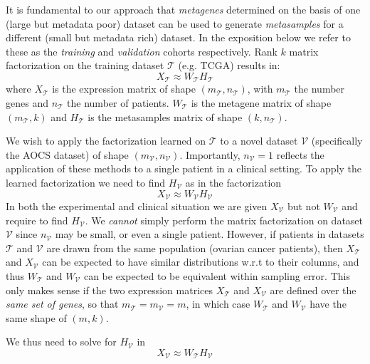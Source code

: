 \documentclass[tikz, 11pt,a4paper,oneside,fleqn, draft]{article}
\begin{document}
\newcommand{\trainset}{\mathcal{T}}
\newcommand{\validset}{\mathcal{V}}

It is fundamental to our approach that \emph{metagenes} determined on the basis of one (large but metadata poor) dataset can be used to generate \emph{metasamples} for a different (small but metadata rich) dataset.   In the exposition below we refer to these as the \emph{training} and \emph{validation} cohorts respectively.
Rank $k$ matrix factorization on the training dataset $\trainset$ (e.g. TCGA) results in:
\begin{equation}
 X_\trainset \approx W_\trainset H_\trainset
\end{equation}
where $X_\trainset$ is the expression matrix of shape $(m_\trainset, n_\trainset)$, with $m_\trainset$ the number genes and $n_\trainset$ the number of patients. $W_\trainset$ is the metagene matrix of shape $(m_\trainset, k)$ and $H_\trainset$ is the metasamples matrix of shape $(k, n_\trainset)$.

We wish to apply the factorization learned on $\trainset$ to a novel dataset $\validset$ (specifically the AOCS dataset) of shape $(m_\validset, n_\validset)$. 
Importantly, $n_\validset = 1$ reflects the application of these methods to a single patient in a clinical setting.  To apply the learned factorization we need to find $H_\validset$ as in the factorization
\begin{equation}
	X_\validset \approx W_\validset H_\validset
\end{equation}
In both the experimental and clinical situation we are given $X_\validset$ but not $W_\validset$ and require to find $H_\validset$. 
We \emph{cannot} simply perform the matrix factorization on dataset $\validset$ since $n_\validset$ may be small, or even a single patient.   
However, if patients in datasets $\trainset$ and $\validset$ are drawn from the same population (ovarian cancer patients), then $X_\trainset$ and $X_\validset$ can be expected to have similar distributions w.r.t to their columns, and thus $W_\trainset$ and $W_\validset$ can be expected to be equivalent within sampling error.  
This only makes sense if the two expression matrices $X_\trainset$ and $X_\validset$ are defined over the \emph{same set of genes}, so that $m_\trainset = m_\validset = m$, in which case $W_\trainset$ and $W_\validset$ have the same shape of $(m, k)$.   

We thus need to solve for $H_\validset$ in
\begin{equation}
	X_\validset  \approx  W_\trainset H_\validset \label{eq_Xv_WtHv}
\end{equation}
\end{document}

